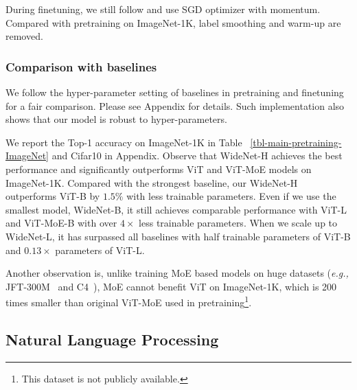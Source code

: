 \documentclass[letterpaper]{article} \usepackage{aaai22}  \usepackage{times}  \usepackage{helvet}  \usepackage{courier}  \usepackage[hyphens]{url}  \usepackage{graphicx} \urlstyle{rm} \def\UrlFont{\rm}  \usepackage{natbib}  \usepackage{caption} \DeclareCaptionStyle{ruled}{labelfont=normalfont,labelsep=colon,strut=off} \frenchspacing  \setlength{\pdfpagewidth}{8.5in}  \setlength{\pdfpageheight}{11in}  \usepackage{algorithm}
\newcommand{\eg}{\emph{e.g.,}\xspace}
\begin{document}
During finetuning, we still follow \cite{dosovitskiy2020image} and use SGD optimizer with momentum. Compared with pretraining on ImageNet-1K, label smoothing and warm-up are removed. 







\subsubsection{Comparison with baselines}



We follow the hyper-parameter setting of baselines in pretraining and finetuning for a fair comparison. Please see Appendix for details. Such implementation also shows that our model is robust to hyper-parameters. 












We report the Top-1 accuracy on ImageNet-1K in Table ~\ref{tbl-main-pretraining-ImageNet} and Cifar10 in Appendix. Observe that WideNet-H achieves the best performance and significantly outperforms ViT and ViT-MoE models on ImageNet-1K. Compared with the strongest baseline, our WideNet-H outperforms ViT-B by $1.5\%$ with less trainable parameters. Even if we use the smallest model, WideNet-B, it still achieves comparable performance with ViT-L and ViT-MoE-B with over $4 \times$ less trainable parameters. When we scale up to WideNet-L, it has surpassed all baselines with half trainable parameters of ViT-B and $0.13 \times$ parameters of ViT-L. 

Another observation is, unlike training MoE based models on huge datasets (\eg JFT-300M~\citep{sun2017revisiting} and C4~\citep{raffel2019exploring}), MoE cannot benefit ViT on ImageNet-1K, which is 200 times smaller than original ViT-MoE used in pretraining\footnote{This dataset is not publicly available.}.


\subsection{Natural Language Processing}
\label{sec:nlp}
\end{document}
